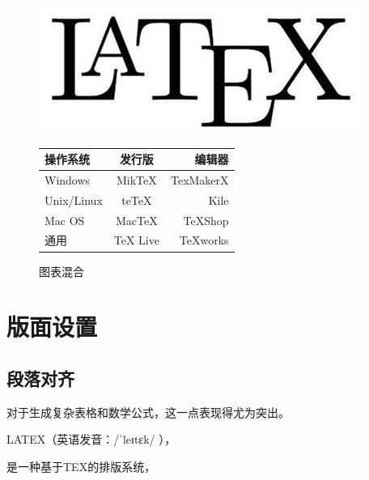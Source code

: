 \begin{figure}[htb]
    \centering
    \begin{minipage}[c]{0.4\linewidth}
        \centering
        \includegraphics[width=\linewidth]{figure/Latex.jpg}
        \caption{图表混合}
        \label{fig:myfig12}
    \end{minipage}
    \quad
    \begin{minipage}[c]{0.4\linewidth}
        \centering
        \begin{tabular}{|l|c|r|}
             \hline
            操作系统& 发行版& 编辑器\\
             \hline
            Windows & MikTeX & TexMakerX \\
             \hline
            Unix/Linux & teTeX & Kile \\
             \hline
            Mac OS & MacTeX & TeXShop \\
             \hline
            通用& TeX Live & TeXworks \\
             \hline
        \end{tabular}
        \label{tab:mytab6}
    \end{minipage}
\end{figure}

\section{版面设置}

\subsection{段落对齐}

\begin{center}
对于生成复杂表格和数学公式，这一点表现得尤为突出。
\end{center}
\begin{flushleft}
LATEX（英语发音：/ˈleɪtɛk/ ），
\end{flushleft}
\begin{flushright}
是一种基于TEX的排版系统，
\end{flushright}

